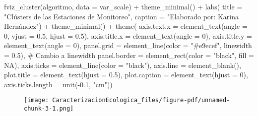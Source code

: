 \documentclass[
  10pt,
  letterpaper,
  DIV=11,
  numbers=noendperiod]{scrreprt}
\newenvironment{Shaded}{\begin{snugshade}}{\end{snugshade}}
\newcommand{\AttributeTok}[1]{\textcolor[rgb]{0.40,0.45,0.13}{#1}}
\newcommand{\CommentTok}[1]{\textcolor[rgb]{0.37,0.37,0.37}{#1}}
\newcommand{\ConstantTok}[1]{\textcolor[rgb]{0.56,0.35,0.01}{#1}}
\newcommand{\DecValTok}[1]{\textcolor[rgb]{0.68,0.00,0.00}{#1}}
\newcommand{\FloatTok}[1]{\textcolor[rgb]{0.68,0.00,0.00}{#1}}
\newcommand{\FunctionTok}[1]{\textcolor[rgb]{0.28,0.35,0.67}{#1}}
\newcommand{\NormalTok}[1]{\textcolor[rgb]{0.00,0.23,0.31}{#1}}
\newcommand{\SpecialCharTok}[1]{\textcolor[rgb]{0.37,0.37,0.37}{#1}}
\newcommand{\StringTok}[1]{\textcolor[rgb]{0.13,0.47,0.30}{#1}}
\begin{document}
\begin{Shaded}
\begin{Highlighting}[numbers=left,,]
\FunctionTok{fviz\_cluster}\NormalTok{(algoritmo,}
             \AttributeTok{data =}\NormalTok{ var\_scale) }\SpecialCharTok{+}
    \FunctionTok{theme\_minimal}\NormalTok{() }\SpecialCharTok{+}
    \FunctionTok{labs}\NormalTok{(}
        \AttributeTok{title =} \StringTok{"Clústers de las Estaciones de Monitoreo"}\NormalTok{,}
        \AttributeTok{caption =} \StringTok{"Elaborado por: Karina Hernández"}\NormalTok{) }\SpecialCharTok{+}
    \FunctionTok{theme\_minimal}\NormalTok{() }\SpecialCharTok{+}
    \FunctionTok{theme}\NormalTok{(}
        \AttributeTok{axis.text.x =} \FunctionTok{element\_text}\NormalTok{(}\AttributeTok{angle =} \DecValTok{0}\NormalTok{,}
                                   \AttributeTok{vjust =} \FloatTok{0.5}\NormalTok{,}
                                   \AttributeTok{hjust =} \FloatTok{0.5}\NormalTok{),}
        \AttributeTok{axis.title.x =} \FunctionTok{element\_text}\NormalTok{(}\AttributeTok{angle =} \DecValTok{0}\NormalTok{),}
        \AttributeTok{axis.title.y =} \FunctionTok{element\_text}\NormalTok{(}\AttributeTok{angle =} \DecValTok{0}\NormalTok{),}
        \AttributeTok{panel.grid =} \FunctionTok{element\_line}\NormalTok{(}\AttributeTok{color =} \StringTok{"\#e9ecef"}\NormalTok{, }\AttributeTok{linewidth =} \FloatTok{0.5}\NormalTok{),  }\CommentTok{\# Cambio a linewidth}
        \AttributeTok{panel.border =} \FunctionTok{element\_rect}\NormalTok{(}\AttributeTok{color =} \StringTok{"black"}\NormalTok{, }\AttributeTok{fill =} \ConstantTok{NA}\NormalTok{),}
        \AttributeTok{axis.ticks =} \FunctionTok{element\_line}\NormalTok{(}\AttributeTok{color =} \StringTok{"black"}\NormalTok{),}
        \AttributeTok{axis.line =} \FunctionTok{element\_blank}\NormalTok{(),}
        \AttributeTok{plot.title =} \FunctionTok{element\_text}\NormalTok{(}\AttributeTok{hjust =} \FloatTok{0.5}\NormalTok{),}
        \AttributeTok{plot.caption =} \FunctionTok{element\_text}\NormalTok{(}\AttributeTok{hjust =} \DecValTok{0}\NormalTok{),}
        \AttributeTok{axis.ticks.length =} \FunctionTok{unit}\NormalTok{(}\SpecialCharTok{{-}}\FloatTok{0.1}\NormalTok{, }\StringTok{"cm"}\NormalTok{))}
\end{Highlighting}
\end{Shaded}

\begin{figure}[tb]

{\centering \texttt{[image: CaracterizacionEcologica\_files/figure-pdf/unnamed-chunk-3-1.png]}

}

\end{figure}
\end{document}

